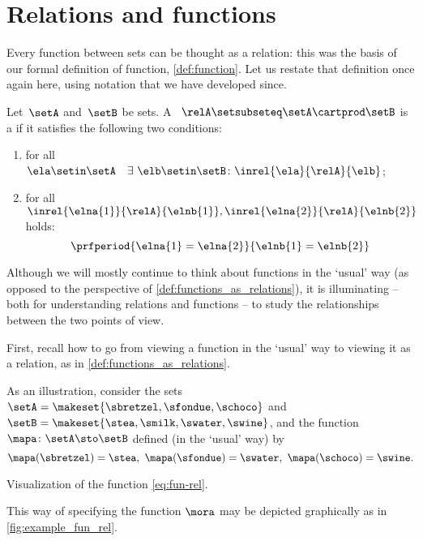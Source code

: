 
\section{Relations and functions}

Every function between sets can be thought as a relation: this was the basis of our formal definition of function, \cref{def:function}.
Let us restate that definition once again here, using notation that we have developed since.

\begin{definition}
    \label{def:functions_as_relations}
    Let~$\setA$ and~$\setB$ be sets.
    A ~$\relA \setsubseteq \setA \cartprod \setB$ is a \emph{} if it satisfies the following two conditions:
    \begin{enumerate}
        \item for all~$\ela \setin \setA \quad \exists \ \elb \setin \setB\colon  \inrel{\ela}{\relA}{\elb}$;
        \item for all~$\inrel{\elna{1}}{\relA}{\elnb{1}}, \inrel{\elna{2}}{\relA}{\elnb{2}}$ holds:
              \begin{equation}
                  \prfperiod{
                      \elna{1} = \elna{2}
                  }{
                      \elnb{1} = \elnb{2}
                  }
              \end{equation}
    \end{enumerate}
\end{definition}

Although we will mostly continue to think about functions in the `usual' way (as opposed to the perspective of \cref{def:functions_as_relations}), it is illuminating -- both for understanding relations and functions -- to study the relationships between the two points of view.

First, recall how to go from viewing a function in the `usual' way to viewing it as a relation, as in \cref{def:functions_as_relations}.

As an illustration, consider the sets~$\setA = \makeset{ \sbretzel, \sfondue, \schoco }$ and~$\setB = \makeset{ \stea, \smilk, \swater, \swine }$, and the function~$\mapa \colon \setA \sto \setB$ defined (in the `usual' way) by
\begin{equation}
    \mapa (\sbretzel) = \stea, \ \mapa (\sfondue) = \swater, \ \mapa(\schoco) = \swine.
\end{equation}
\begin{marginfigure}
    \centering
    \caption{Visualization of the function \cref{eq:fun-rel}.}
    \label{fig:example_fun_rel}
\end{marginfigure}
This way of specifying the function $\mora$ may be depicted graphically as in \cref{fig:example_fun_rel}.

